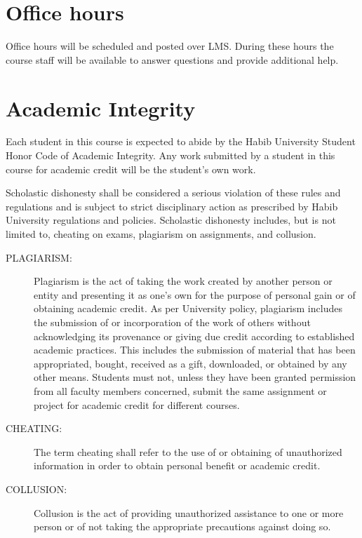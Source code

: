 \documentclass[a4paper]{article}
\begin{document}
\section{Office hours}

Office hours will be scheduled and posted over LMS. During these hours the course staff will be available to answer questions and provide additional help.

\section{Academic Integrity}

Each student in this course is expected to abide by the Habib University Student Honor Code of Academic Integrity.  Any work submitted by a student in this course for academic credit will be the student's own work.


Scholastic dishonesty shall be considered a serious violation of these rules and regulations and is subject to strict disciplinary action as prescribed by Habib University regulations and policies. Scholastic dishonesty includes, but is not limited to, cheating on exams, plagiarism on assignments, and collusion.
\begin{description}

\item[PLAGIARISM:] Plagiarism is the act of taking the work created by another person or entity and presenting it as one's own for the purpose of personal gain or of obtaining academic credit. As per University policy, plagiarism includes the submission of or incorporation of the work of others without acknowledging its provenance or giving due credit according to established academic practices. This includes the submission of material that has been appropriated, bought, received as a gift, downloaded, or obtained by any other means. Students must not, unless they have been granted permission from all faculty members concerned, submit the same assignment or project for academic credit for different courses. 

\item[CHEATING:] The term cheating shall refer to the use of or obtaining of unauthorized information in order to obtain personal benefit or academic credit. 

\item[COLLUSION:] Collusion is the act of providing unauthorized assistance to one or more person or of not taking the appropriate precautions against doing so.
\end{description}
\end{document}
